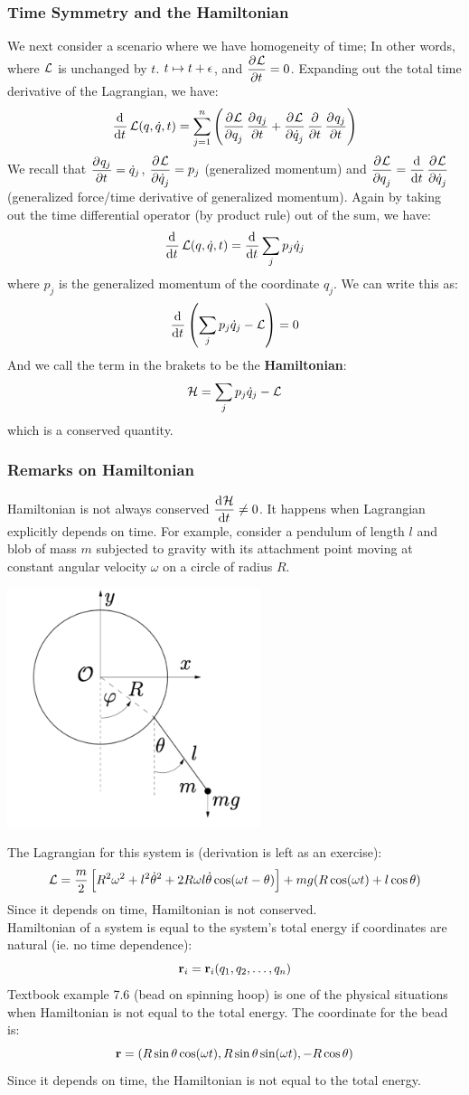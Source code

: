 \subsubsection{Time Symmetry and the Hamiltonian}
We next consider a scenario where we have homogeneity of time; In other words, where $\mathcal{L}$ is unchanged by $t$. $t \mapsto t + \epsilon$, and $\dpd{\LL}{t} = 0$. Expanding out the total time derivative of the Lagrangian, we have:
\[\dod{}{t}\LL(q, \dot{q}, t) = \sum_{j=1}^n \left(\dpd{\LL}{q_j}\dpd{q_j}{t} + \dpd{\LL}{\dot{q}_j}\dpd{}{t}\dpd{q_j}{t}\right)\]
We recall that $\dpd{q_j}{t} = \dot{q}_j$, $\dpd{\LL}{\dot{q}_j} = p_j$ (generalized momentum) and $\dpd{\LL}{q_j} = \dod{}{t}\dpd{\LL}{\dot{q}_j}$ (generalized force/time derivative of generalized momentum). Again by taking out the time differential operator (by product rule) out of the sum, we have:
\[\dod{}{t}\LL(q, \dot{q}, t) = \dod{}{t}\sum_jp_j\dot{q}_j\]
where $p_j$ is the generalized momentum of the coordinate $q_j$. We can write this as:
\[\dod{}{t}\left(\sum_jp_j\dot{q}_j - \LL\right) = 0\]
And we call the term in the brakets to be the \textbf{Hamiltonian}:
\[\mathcal{H} = \sum_jp_j\dot{q}_j - \mathcal{L}\]
which is a conserved quantity.
\subsubsection{Remarks on Hamiltonian}
Hamiltonian is not always conserved $\dod{\HH}{t}\ne0$. It happens when Lagrangian explicitly depends on time. For example, consider a pendulum of length $l$ and blob of mass $m$ subjected to gravity with its attachment point moving at constant angular velocity $\omega$ on a circle of radius $R$.
\begin{center}
    \includegraphics[scale=0.8]{Lecture-7/L7-img2.png}
\end{center}
The Lagrangian for this system is (derivation is left as an exercise):
\[ \mathcal{L}=\frac{m}{2}\left[ R^2\omega^2+l^2\dot{\theta}^2+2R\omega l \dot{\theta}\cos(\omega t - \theta) \right] + mg(R\cos(\omega t)+l\cos\theta) \]
Since it depends on time, Hamiltonian is not conserved. \\
Hamiltonian of a system is equal to the system's total energy if coordinates are natural (ie. no time dependence):
\[\mathbf{r}_i=\mathbf{r}_i(q_1,q_2,\dots,q_n)\]
Textbook example 7.6 (bead on spinning hoop) is one of the physical situations when Hamiltonian is not equal to the total energy. The coordinate for the bead is:
\[\mathbf{r}=(R\sin\theta\cos(\omega t),R\sin\theta\sin(\omega t),-R\cos\theta)\]
Since it depends on time, the Hamiltonian is not equal to the total energy.